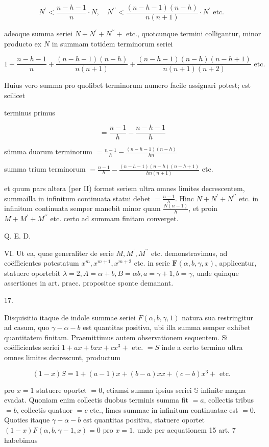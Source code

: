 \documentclass[10pt]{article}
\begin{document}
\[
N^{\prime}<\frac{n-h-1}{n} \cdot N, \quad N^{\prime \prime}<\frac{(n-h-1)(n-h)}{n(n+1)} \cdot N^{\prime} \text { etc. }
\]

adeoque summa seriei \(N+N^{\prime}+N^{\prime \prime}+\) etc., quotcunque termini colligantur, minor producto ex \(N\) in summam totidem terminorum seriei

\[
1+\frac{n-h-1}{n}+\frac{(n-h-1)(n-h)}{n(n+1)}+\frac{(n-h-1)(n-h)(n-h+1)}{n(n+1)(n+2)} \text { etc. }
\]

Huius vero summa pro quolibet terminorum numero facile assignari potest; est scilicet

terminus primus

\[
=\frac{n-1}{h}-\frac{n-h-1}{h}
\]

sümma duorum terminorum \(=\frac{n-1}{h}-\frac{(n-h-1)(n-h)}{h n}\)

summa trium terminorum \(=\frac{n-1}{h}-\frac{(n-h-1)(n-h)(n-h+1)}{h n(n+1)}\) etc.

et quum pars altera (per II) formet seriem ultra omnes limites decrescentem, summailla in infinitum continuata statui debet \(=\frac{n-1}{h}\). Hinc \(N+N^{\prime}+N^{\prime \prime}\) etc. in infinitum continuata semper manebit minor quam \(\frac{N(n-1)}{h}\), et proin \(M+M^{\prime}+M^{\prime \prime}\) etc. certo ad summam finitam converget.

Q. E. D.

VI. Ut ea, quae generaliter de serie \(M, M^{\prime}, M^{\prime \prime}\) etc. demonstravimus, ad coëfficientes potestatum \(x^{m}, x^{m+1}, x^{m+2}\) etc. in serie \(\boldsymbol{F}(\alpha, b, \gamma, x)\), applicentur, statuere oportebit \(\lambda=2, A=\alpha+b, B=\alpha b, a=\gamma+1, b=\gamma\), unde quinque assertiones in art. praec. propositae sponte demanant.

17.

Disquisitio itaque de indole summae seriei \(F(\alpha, b, \gamma, 1)\) natura sua restringitur ad casum, quo \(\gamma-\alpha-b\) est quantitas positiva, ubi illa summa semper exhibet quantitatem finitam. Praemittimus autem observationem sequentem. Si coëfficientes seriei \(1+a x+b x x+c x^{3}+\) etc. \(=S\) inde a certo termino ultra omnes limites decrescunt, productum

\[
(1-x) S=1+(a-1) x+(b-a) x x+(c-b) x^{3}+\text { etc. }
\]

pro \(x=1\) statuere oportet \(=0\), etiamsi summa ipsius seriei \(\mathbb{S}\) infinite magna evadat. Quoniam enim collectis duobus terminis summa fit \(=a\), collectis tribus \(=b\), collectis quatuor \(=c\) etc., limes summae in infinitum continuatae est \(=0\). Quoties itaque \(\gamma-\alpha-b\) est quantitas positiva, statuere oportet \((1-x) F(\alpha, b, \gamma-1, x)=0\) pro \(x=1\), unde per aequationem 15 art. 7 habebimus
\end{document}

